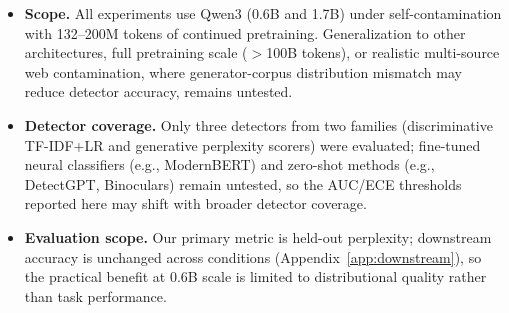 \begin{itemize}[nosep,leftmargin=*]
\item \textbf{Scope.}
All experiments use Qwen3 (0.6B and 1.7B) under self-contamination with 132--200M tokens of continued pretraining.
Generalization to other architectures, full pretraining scale ($>$100B tokens), or realistic multi-source web contamination, where generator-corpus distribution mismatch may reduce detector accuracy, remains untested.

\item \textbf{Detector coverage.}
Only three detectors from two families (discriminative TF-IDF+LR and generative perplexity scorers) were evaluated; fine-tuned neural classifiers (e.g., ModernBERT) and zero-shot methods (e.g., DetectGPT, Binoculars) remain untested, so the AUC/ECE thresholds reported here may shift with broader detector coverage.

\item \textbf{Evaluation scope.}
Our primary metric is held-out perplexity; downstream accuracy is unchanged across conditions (Appendix~\ref{app:downstream}), so the practical benefit at 0.6B scale is limited to distributional quality rather than task performance.
\end{itemize}
